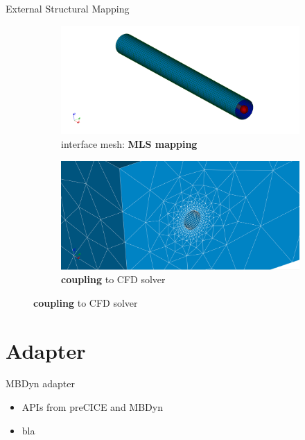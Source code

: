 \documentclass[10pt,t]{beamer}
\begin{document}
\begin{frame}{External Structural Mapping}
\begin{figure}
  \begin{subfigure}[t]{.486\textwidth}
    \centering
    \includegraphics[width=\linewidth]{images/mesh_1b.png}
    \caption{interface mesh: \textbf{MLS mapping}}
  \end{subfigure}
  \hfill
  \begin{subfigure}[t]{.486\textwidth}
    \centering
    \includegraphics[width=\linewidth]{images/whole_1aa.png}
    \caption{\textbf{coupling} to CFD solver}
  \end{subfigure}
\end{figure}


\end{frame}





\section{Adapter}

\begin{frame}{MBDyn adapter}
    \begin{itemize}
        \item APIs from preCICE and MBDyn
        \item bla
    \end{itemize}
\end{frame}
\end{document}
